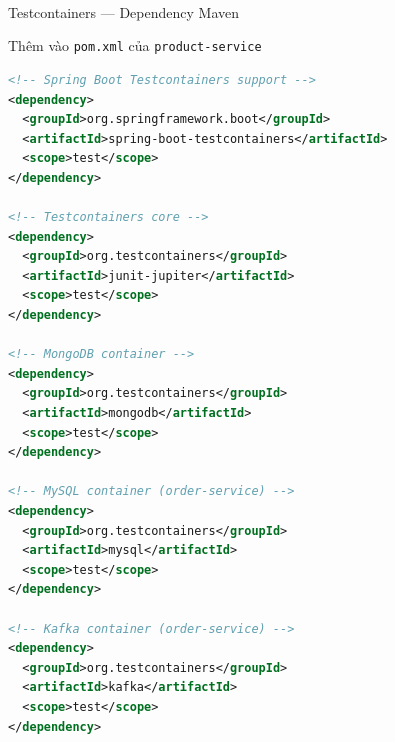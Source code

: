 \documentclass[aspectratio=169,10pt]{beamer}
\newcommand{\sref}[1]{\textsuperscript{\scriptsize\cite{#1}}}
\begin{document}
\begin{frame}[fragile]{Testcontainers --- Dependency Maven\sref{testcontainers}}
  \begin{block}{Thêm vào \texttt{pom.xml} của \texttt{product-service}}
\begin{lstlisting}[language=XML,style=xml]
<!-- Spring Boot Testcontainers support -->
<dependency>
  <groupId>org.springframework.boot</groupId>
  <artifactId>spring-boot-testcontainers</artifactId>
  <scope>test</scope>
</dependency>

<!-- Testcontainers core -->
<dependency>
  <groupId>org.testcontainers</groupId>
  <artifactId>junit-jupiter</artifactId>
  <scope>test</scope>
</dependency>

<!-- MongoDB container -->
<dependency>
  <groupId>org.testcontainers</groupId>
  <artifactId>mongodb</artifactId>
  <scope>test</scope>
</dependency>

<!-- MySQL container (order-service) -->
<dependency>
  <groupId>org.testcontainers</groupId>
  <artifactId>mysql</artifactId>
  <scope>test</scope>
</dependency>

<!-- Kafka container (order-service) -->
<dependency>
  <groupId>org.testcontainers</groupId>
  <artifactId>kafka</artifactId>
  <scope>test</scope>
</dependency>
\end{lstlisting}
  \end{block}
\end{frame}
\end{document}
